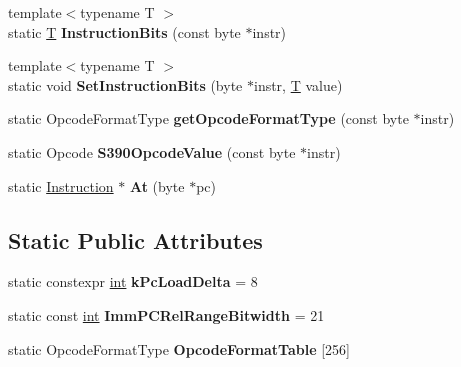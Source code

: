 \begin{DoxyCompactItemize}
{\footnotesize template$<$typename T $>$ }\\static \mbox{\hyperlink{classv8_1_1internal_1_1torque_1_1T}{T}} {\bfseries Instruction\+Bits} (const byte $\ast$instr)
\item 
\mbox{\label{classv8_1_1internal_1_1Instruction_a6da14f51a73fa72ff9f8c45dbe4c0fb0}} 
{\footnotesize template$<$typename T $>$ }\\static void {\bfseries Set\+Instruction\+Bits} (byte $\ast$instr, \mbox{\hyperlink{classv8_1_1internal_1_1torque_1_1T}{T}} value)
\item 
\mbox{\label{classv8_1_1internal_1_1Instruction_a4adaa2f1f1687001718a1ce29f51bb7a}} 
static Opcode\+Format\+Type {\bfseries get\+Opcode\+Format\+Type} (const byte $\ast$instr)
\item 
\mbox{\label{classv8_1_1internal_1_1Instruction_a9ec1310621a44573f53df905664f7e14}} 
static Opcode {\bfseries S390\+Opcode\+Value} (const byte $\ast$instr)
\item 
\mbox{\label{classv8_1_1internal_1_1Instruction_ababb29269d211ebdc2c9c772e06dc85e}} 
static \mbox{\hyperlink{classv8_1_1internal_1_1Instruction}{Instruction}} $\ast$ {\bfseries At} (byte $\ast$pc)
\end{DoxyCompactItemize}
\subsection*{Static Public Attributes}
\begin{DoxyCompactItemize}
\item 
\mbox{\label{classv8_1_1internal_1_1Instruction_a4eb6d93f2e4ff786fe99bb16ccb91592}} 
static constexpr \mbox{\hyperlink{classint}{int}} {\bfseries k\+Pc\+Load\+Delta} = 8
\item 
\mbox{\label{classv8_1_1internal_1_1Instruction_aa9f82f3a387d3ae9e7a615077602cccb}} 
static const \mbox{\hyperlink{classint}{int}} {\bfseries Imm\+P\+C\+Rel\+Range\+Bitwidth} = 21
\item 
\mbox{\label{classv8_1_1internal_1_1Instruction_ac0a399cb509d4df1428caf368a1bcb71}} 
static Opcode\+Format\+Type {\bfseries Opcode\+Format\+Table} \mbox{[}256\mbox{]}
\end{DoxyCompactItemize}


